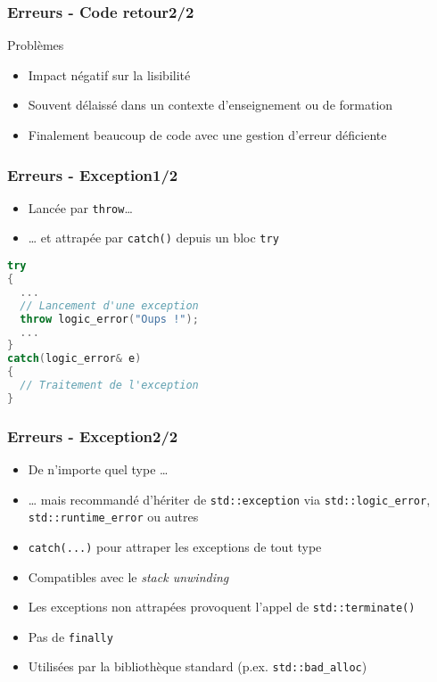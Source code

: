 \documentclass[C++.tex]{subfiles}
\begin{document}
\begin{frame}
	\frametitle{Erreurs -  Code retour\titlehfill{}2/2}
	\begin{alertblock}{Problèmes}
		\begin{itemize}
			\item Impact négatif sur la lisibilité
			\item Souvent délaissé dans un contexte d'enseignement ou de formation


			\item Finalement beaucoup de code avec une gestion d'erreur déficiente
		\end{itemize}
	\end{alertblock}
\end{frame}

\begin{frame}[fragile]
	\frametitle{Erreurs - Exception\titlehfill{}1/2}
	\begin{itemize}
		\item Lancée par \lstinline|throw|\dots{}
		\item \dots{} et attrapée par \lstinline|catch()| depuis un bloc \lstinline|try|
	\end{itemize}

	\begin{lstlisting}[language=C++]
try
{
  ...
  // Lancement d'une exception
  throw logic_error("Oups !");
  ...
}
catch(logic_error& e)
{
  // Traitement de l'exception
}\end{lstlisting}
\end{frame}

\begin{frame}
	\frametitle{Erreurs - Exception\titlehfill{}2/2}
	\begin{itemize}
		\item De n'importe quel type \dots{}
		\item \dots{} mais recommandé d'hériter de \lstinline|std::exception| via \lstinline|std::logic_error|, \lstinline|std::runtime_error| ou autres
		\item \lstinline{catch(...)} pour attraper les exceptions de tout type
		\item Compatibles avec le \textit{stack unwinding}


		\item Les exceptions non attrapées provoquent l'appel de \lstinline|std::terminate()|


		\item Pas de \lstinline[keywordstyle=\color{black}]|finally|
		\item Utilisées par la bibliothèque standard (p.ex. \lstinline|std::bad_alloc|)
	\end{itemize}
\end{frame}
\end{document}
